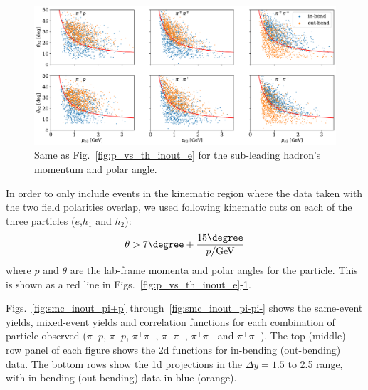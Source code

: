 \begin{figure}
    \centering
    \includegraphics[width=\textwidth]{images/p_vs_th_inout_h2.pdf}
    \caption{Same as Fig.~\ref{fig:p_vs_th_inout_e} for the sub-leading hadron's momentum and polar angle.}
    \label{fig:p_vs_th_inout_h2}
\end{figure}

In order to only include events in the kinematic region where the data taken with the two field polarities overlap, we used following kinematic cuts on each of the three particles ($e$,$h_1$ and $h_2$):
\begin{equation}
    \theta > 7\degree + \frac{15\degree}{p/{\rm GeV}}
\end{equation}
where $p$ and $\theta$ are the lab-frame momenta and polar angles for the particle.  This is shown as a red line in Figs.~\ref{fig:p_vs_th_inout_e}-\ref{fig:p_vs_th_inout_h2}.   



Figs.~\ref{fig:smc_inout_pi+p} through~\ref{fig:smc_inout_pi-pi-} shows the same-event yields, mixed-event yields and correlation functions for each combination of particle observed ($\pi^+ p$, $\pi^- p$, $\pi^+\pi^+$, $\pi^-\pi^+$, $\pi^+\pi^-$ and $\pi^+\pi^-$). The top (middle) row panel of each figure shows the 2d functions for in-bending (out-bending) data.  The bottom rows show the 1d projections in the $\Delta y=1.5$ to 2.5 range, with in-bending (out-bending) data in blue (orange).  

